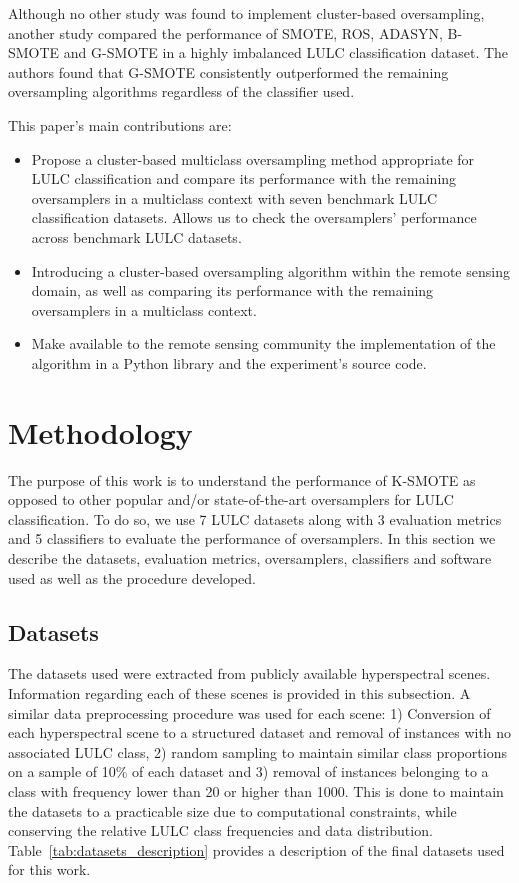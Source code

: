 \documentclass[remotesensing,article,submit,moreauthors,pdftex]{Definitions/mdpi}
\begin{document}
\begin{paracol}{2}
\linenumbers
\switchcolumn

Although no other study was found to implement cluster-based oversampling,
another study \cite{Douzas2019rs} compared the performance of SMOTE, ROS,
ADASYN, B-SMOTE and G-SMOTE in a highly imbalanced LULC classification dataset.
The authors found that G-SMOTE consistently outperformed the remaining
oversampling algorithms regardless of the classifier used.

This paper's main contributions are:
\begin{itemize}
    \item Propose a cluster-based multiclass oversampling method appropriate
        for LULC classification and compare its performance with the remaining
        oversamplers in a multiclass context with seven benchmark LULC
        classification datasets. Allows us to check the oversamplers'
        performance across benchmark LULC datasets.
    \item Introducing a cluster-based oversampling algorithm within the remote
        sensing domain, as well as comparing its performance with the remaining
        oversamplers in a multiclass context.
    \item Make available to the remote sensing community the implementation
        of the algorithm in a Python library and the experiment's source code.
\end{itemize}

\section{Methodology}\label{sec:methodology}

The purpose of this work is to understand the performance of K-SMOTE as
opposed to other popular and/or state-of-the-art oversamplers for LULC
classification. To do so, we use 7 LULC datasets along with 3 evaluation
metrics and 5 classifiers to evaluate the performance of oversamplers. In this
section we describe the datasets, evaluation metrics, oversamplers,
classifiers and software used as well as the procedure developed.

\subsection{Datasets}

The datasets used were extracted from publicly available hyperspectral scenes.
Information regarding each of these scenes is provided in this subsection. A
similar data preprocessing procedure was used for each scene: 1) Conversion of
each hyperspectral scene to a structured dataset and removal of instances with
no associated LULC class, 2) random sampling to maintain similar class
proportions on a sample of 10\% of each dataset and 3) removal of instances
belonging to a class with frequency lower than 20 or higher than 1000. This is
done to maintain the datasets to a practicable size due to computational
constraints, while conserving the relative LULC class frequencies and data
distribution. Table~\ref{tab:datasets_description} provides a description of the
final datasets used for this work.

\end{paracol}
\end{document}
